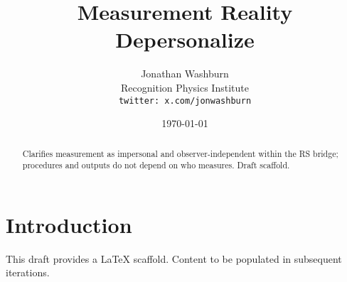 \documentclass[11pt,letterpaper]{article}
\title{Measurement Reality Depersonalize}
\author{Jonathan Washburn\\Recognition Physics Institute\\\texttt{twitter: x.com/jonwashburn}}
\date{\today}
\begin{document}
\maketitle
\begin{abstract}
Clarifies measurement as impersonal and observer-independent within the RS bridge; procedures and outputs do not depend on who measures. Draft scaffold.
\end{abstract}
\section{Introduction}
This draft provides a LaTeX scaffold. Content to be populated in subsequent iterations.
\end{document}
